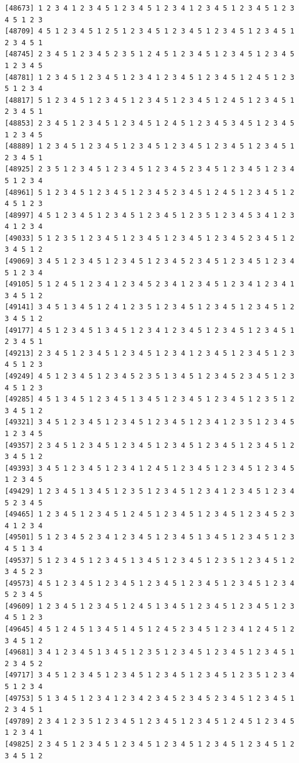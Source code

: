 \documentclass[
  11pt,
]{book}
\begin{document}
\begin{verbatim}
[48673] 1 2 3 4 1 2 3 4 5 1 2 3 4 5 1 2 3 4 1 2 3 4 5 1 2 3 4 5 1 2 3 4 5 1 2 3
[48709] 4 5 1 2 3 4 5 1 2 5 1 2 3 4 5 1 2 3 4 5 1 2 3 4 5 1 2 3 4 5 1 2 3 4 5 1
[48745] 2 3 4 5 1 2 3 4 5 2 3 5 1 2 4 5 1 2 3 4 5 1 2 3 4 5 1 2 3 4 5 1 2 3 4 5
[48781] 1 2 3 4 5 1 2 3 4 5 1 2 3 4 1 2 3 4 5 1 2 3 4 5 1 2 4 5 1 2 3 5 1 2 3 4
[48817] 5 1 2 3 4 5 1 2 3 4 5 1 2 3 4 5 1 2 3 4 5 1 2 4 5 1 2 3 4 5 1 2 3 4 5 1
[48853] 2 3 4 5 1 2 3 4 5 1 2 3 4 5 1 2 4 5 1 2 3 4 5 3 4 5 1 2 3 4 5 1 2 3 4 5
[48889] 1 2 3 4 5 1 2 3 4 5 1 2 3 4 5 1 2 3 4 5 1 2 3 4 5 1 2 3 4 5 1 2 3 4 5 1
[48925] 2 3 5 1 2 3 4 5 1 2 3 4 5 1 2 3 4 5 2 3 4 5 1 2 3 4 5 1 2 3 4 5 1 2 3 4
[48961] 5 1 2 3 4 5 1 2 3 4 5 1 2 3 4 5 2 3 4 5 1 2 4 5 1 2 3 4 5 1 2 4 5 1 2 3
[48997] 4 5 1 2 3 4 5 1 2 3 4 5 1 2 3 4 5 1 2 3 5 1 2 3 4 5 3 4 1 2 3 4 1 2 3 4
[49033] 5 1 2 3 5 1 2 3 4 5 1 2 3 4 5 1 2 3 4 5 1 2 3 4 5 2 3 4 5 1 2 3 4 5 1 2
[49069] 3 4 5 1 2 3 4 5 1 2 3 4 5 1 2 3 4 5 2 3 4 5 1 2 3 4 5 1 2 3 4 5 1 2 3 4
[49105] 5 1 2 4 5 1 2 3 4 1 2 3 4 5 2 3 4 1 2 3 4 5 1 2 3 4 1 2 3 4 1 3 4 5 1 2
[49141] 3 4 5 1 3 4 5 1 2 4 1 2 3 5 1 2 3 4 5 1 2 3 4 5 1 2 3 4 5 1 2 3 4 5 1 2
[49177] 4 5 1 2 3 4 5 1 3 4 5 1 2 3 4 1 2 3 4 5 1 2 3 4 5 1 2 3 4 5 1 2 3 4 5 1
[49213] 2 3 4 5 1 2 3 4 5 1 2 3 4 5 1 2 3 4 1 2 3 4 5 1 2 3 4 5 1 2 3 4 5 1 2 3
[49249] 4 5 1 2 3 4 5 1 2 3 4 5 2 3 5 1 3 4 5 1 2 3 4 5 2 3 4 5 1 2 3 4 5 1 2 3
[49285] 4 5 1 3 4 5 1 2 3 4 5 1 3 4 5 1 2 3 4 5 1 2 3 4 5 1 2 3 5 1 2 3 4 5 1 2
[49321] 3 4 5 1 2 3 4 5 1 2 3 4 5 1 2 3 4 5 1 2 3 4 1 2 3 5 1 2 3 4 5 1 2 3 4 5
[49357] 2 3 4 5 1 2 3 4 5 1 2 3 4 5 1 2 3 4 5 1 2 3 4 5 1 2 3 4 5 1 2 3 4 5 1 2
[49393] 3 4 5 1 2 3 4 5 1 2 3 4 1 2 4 5 1 2 3 4 5 1 2 3 4 5 1 2 3 4 5 1 2 3 4 5
[49429] 1 2 3 4 5 1 3 4 5 1 2 3 5 1 2 3 4 5 1 2 3 4 1 2 3 4 5 1 2 3 4 5 2 3 4 5
[49465] 1 2 3 4 5 1 2 3 4 5 1 2 4 5 1 2 3 4 5 1 2 3 4 5 1 2 3 4 5 2 3 4 1 2 3 4
[49501] 5 1 2 3 4 5 2 3 4 1 2 3 4 5 1 2 3 4 5 1 3 4 5 1 2 3 4 5 1 2 3 4 5 1 3 4
[49537] 5 1 2 3 4 5 1 2 3 4 5 1 3 4 5 1 2 3 4 5 1 2 3 5 1 2 3 4 5 1 2 3 4 5 2 3
[49573] 4 5 1 2 3 4 5 1 2 3 4 5 1 2 3 4 5 1 2 3 4 5 1 2 3 4 5 1 2 3 4 5 2 3 4 5
[49609] 1 2 3 4 5 1 2 3 4 5 1 2 4 5 1 3 4 5 1 2 3 4 5 1 2 3 4 5 1 2 3 4 5 1 2 3
[49645] 4 5 1 2 4 5 1 3 4 5 1 4 5 1 2 4 5 2 3 4 5 1 2 3 4 1 2 4 5 1 2 3 4 5 1 2
[49681] 3 4 1 2 3 4 5 1 3 4 5 1 2 3 5 1 2 3 4 5 1 2 3 4 5 1 2 3 4 5 1 2 3 4 5 2
[49717] 3 4 5 1 2 3 4 5 1 2 3 4 5 1 2 3 4 5 1 2 3 4 5 1 2 3 5 1 2 3 4 5 1 2 3 4
[49753] 5 1 3 4 5 1 2 3 4 1 2 3 4 2 3 4 5 2 3 4 5 2 3 4 5 1 2 3 4 5 1 2 3 4 5 1
[49789] 2 3 4 1 2 3 5 1 2 3 4 5 1 2 3 4 5 1 2 3 4 5 1 2 4 5 1 2 3 4 5 1 2 3 4 1
[49825] 2 3 4 5 1 2 3 4 5 1 2 3 4 5 1 2 3 4 5 1 2 3 4 5 1 2 3 4 5 1 2 3 4 5 1 2

\end{verbatim}
\end{document}
